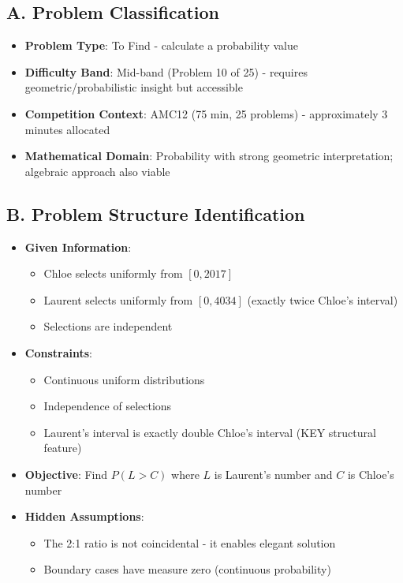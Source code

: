 \documentclass[]{article}
\begin{document}
\begin{problemconfigbox}
\subsection*{A. Problem Classification}
\begin{itemize}[leftmargin=*]
    \item \textbf{Problem Type}: To Find - calculate a probability value
    \item \textbf{Difficulty Band}: Mid-band (Problem 10 of 25) - requires geometric/probabilistic insight but accessible
    \item \textbf{Competition Context}: AMC12 (75 min, 25 problems) - approximately 3 minutes allocated
    \item \textbf{Mathematical Domain}: Probability with strong geometric interpretation; algebraic approach also viable
\end{itemize}

\subsection*{B. Problem Structure Identification}
\begin{itemize}[leftmargin=*]
    \item \textbf{Given Information}: 
    \begin{itemize}
        \item Chloe selects uniformly from $[0, 2017]$
        \item Laurent selects uniformly from $[0, 4034]$ (exactly twice Chloe's interval)
        \item Selections are independent
    \end{itemize}
    
    \item \textbf{Constraints}: 
    \begin{itemize}
        \item Continuous uniform distributions
        \item Independence of selections
        \item Laurent's interval is exactly double Chloe's interval (KEY structural feature)
    \end{itemize}
    
    \item \textbf{Objective}: Find $P(L > C)$ where $L$ is Laurent's number and $C$ is Chloe's number
    
    \item \textbf{Hidden Assumptions}: 
    \begin{itemize}
        \item The 2:1 ratio is not coincidental - it enables elegant solution
        \item Boundary cases have measure zero (continuous probability)
    \end{itemize}
    

\end{itemize}
\end{problemconfigbox}
\end{document}
